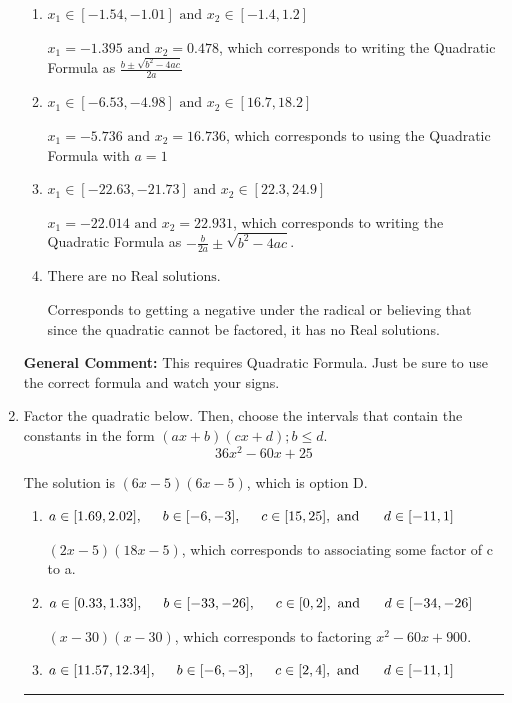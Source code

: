 \documentclass{extbook}[14pt]
\newcommand{\litem}[1]{\item #1

\rule{\textwidth}{0.4pt}}
\begin{document}
\begin{enumerate}
{\begin{enumerate}[label=\Alph*.]
* $x_1 = -0.478 \text{ and } x_2 = 1.395$, which is the correct option.
\item \( x_1 \in [-1.54, -1.01] \text{ and } x_2 \in [-1.4, 1.2] \)

 $x_1 = -1.395 \text{ and } x_2 = 0.478$, which corresponds to writing the Quadratic Formula as $\frac{b \pm \sqrt{b^2 - 4ac}}{2a}$
\item \( x_1 \in [-6.53, -4.98] \text{ and } x_2 \in [16.7, 18.2] \)

 $x_1 = -5.736 \text{ and } x_2 = 16.736$, which corresponds to using the Quadratic Formula with $a=1$
\item \( x_1 \in [-22.63, -21.73] \text{ and } x_2 \in [22.3, 24.9] \)

 $x_1 = -22.014 \text{ and } x_2 = 22.931$, which corresponds to writing the Quadratic Formula as $-\frac{b}{2a} \pm \sqrt{b^2 - 4ac}$.
\item \( \text{There are no Real solutions.} \)

Corresponds to getting a negative under the radical or believing that since the quadratic cannot be factored, it has no Real solutions.
\end{enumerate}

\textbf{General Comment:} This requires Quadratic Formula. Just be sure to use the correct formula and watch your signs.
}
\litem{
Factor the quadratic below. Then, choose the intervals that contain the constants in the form $(ax+b)(cx+d); b \leq d.$
\[ 36x^{2} -60 x + 25 \]

The solution is \( (6x -5)(6x -5) \), which is option D.\begin{enumerate}[label=\Alph*.]
\item \( a \in [1.69, 2.02], \hspace*{5mm} b \in [-6, -3], \hspace*{5mm} c \in [15, 25], \text{ and } \hspace*{5mm} d \in [-11, 1] \)

 $(2x -5)(18x -5)$, which corresponds to associating some factor of c to a.
\item \( a \in [0.33, 1.33], \hspace*{5mm} b \in [-33, -26], \hspace*{5mm} c \in [0, 2], \text{ and } \hspace*{5mm} d \in [-34, -26] \)

 $(x -30)(x -30)$, which corresponds to factoring $x^{2} -60 x + 900$.
\item \( a \in [11.57, 12.34], \hspace*{5mm} b \in [-6, -3], \hspace*{5mm} c \in [2, 4], \text{ and } \hspace*{5mm} d \in [-11, 1] \)


\end{enumerate}}
\end{enumerate}
\end{document}
